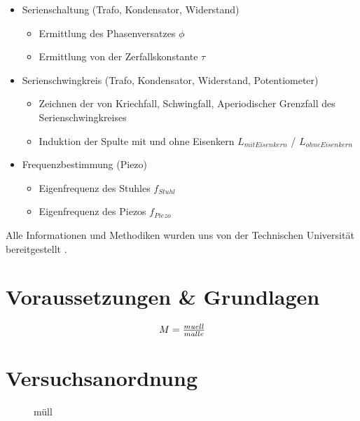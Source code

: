 \documentclass[12pt,a4paper,twoside]{article}
\begin{document}
\begin{itemize}
    \item Serienschaltung (Trafo, Kondensator, Widerstand)
    \begin{itemize}
        \item Ermittlung des Phasenversatzes $\phi$
        \item Ermittlung von der Zerfallskonstante $\tau$
    \end{itemize}
    \item Serienschwingkreis (Trafo, Kondensator, Widerstand, Potentiometer)
    \begin{itemize}
        \item Zeichnen der von Kriechfall, Schwingfall, Aperiodischer Grenzfall des Serienschwingkreises
        \item Induktion der Spulte mit und ohne Eisenkern $L_{mitEisenkern}$ / $L_{ohneEisenkern}$
    \end{itemize}
    \item Frequenzbestimmung (Piezo)
    \begin{itemize}
        \item Eigenfrequenz des Stuhles $f_{Stuhl}$
        \item Eigenfrequenz des Piezos $f_{Piezo}$
    \end{itemize}
\end{itemize}

\noindent
Alle Informationen und Methodiken wurden uns von der Technischen Universität bereitgestellt \cite{teachcenter1}. 



\section{Voraussetzungen \& Grundlagen} %

    \begin{equation}
        \label{eq:Müll}
        \centerline{$M=\frac{muell}{malle}$}
    \end{equation}

\section{Versuchsanordnung} %

    \begin{figure}[H]
        \centering
        \caption{müll}
        \label{fig:müllbild}
    \end{figure}
\end{document}
